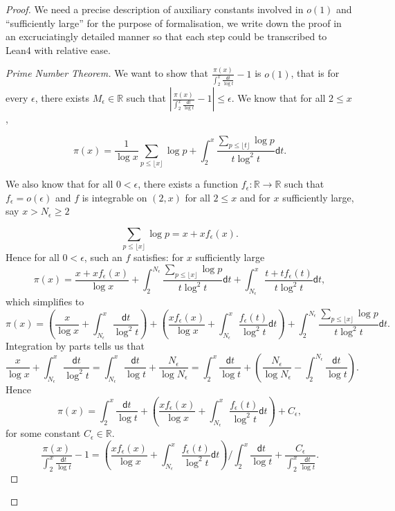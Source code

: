 \begin{proof}
    \leanok
    We need a precise description of auxiliary constants involved in $o(1)$ and ``sufficiently large'' for the purpose of formalisation, we write down the proof in an excruciatingly detailed manner so that each step could be transcribed to Lean4 with relative ease.
    \begin{proof}[Prime Number Theorem]
    We want to show that $\frac{\pi\left(x\right)}{{ \int_{2}^{x}\frac{\mathsf{d}t}{\log t}}}-1$
    is $o\left(1\right)$, that is for every $\epsilon$, there exists
    $M_{\epsilon}\in\mathbb{R}$ such that $\left|\frac{\pi\left(x\right)}{{ \int_{2}^{x}\frac{\mathsf{d}t}{\log t}}}-1\right|\le\epsilon$.
    We know that for all $2\le x$, 
    
    \[
    \pi\left(x\right)={\frac{1}{\log x}\sum_{p\le\lfloor x\rfloor}\log p+{\int_{2}^{x}\frac{\sum_{p\le\lfloor t\rfloor}\log p}{t\log^{2}t}}\mathsf{d}t}.
    \]
    
    We also know that for all $0<\epsilon$, there exists a function $f_{\epsilon}:\mathbb{R}\to\mathbb{R}$
    such that $f_{\epsilon}=o\left(\epsilon\right)$ and $f$ is integrable
    on $\left(2,x\right)$ for all $2\le x$ and for $x$ sufficiently
    large, say $x>N_{\epsilon}\ge2$
    
    \[
    \sum_{p\le\lfloor x\rfloor}\log p=x+xf_{\epsilon}\left(x\right).
    \]
    Hence for all $0<\epsilon$, such an $f$ satisfies: for $x$ sufficiently
    large
    \[
    \pi\left(x\right)=\frac{x+xf_{\epsilon}\left(x\right)}{\log x}+\int_{2}^{N_{\epsilon}}\frac{\sum_{p\le\lfloor x\rfloor}\log p}{t\log^{2}t}\mathsf{d}t+\int_{N_{\epsilon}}^{x}\frac{t+tf_{\epsilon}\left(t\right)}{t\log^{2}t}\mathsf{d}t,
    \]
    which simplifies to
    \[
    \pi\left(x\right)=\left(\frac{x}{\log x}+\int_{N_{\epsilon}}^{x}\frac{\mathsf{d}t}{\log^{2}t}\right)+\left(\frac{xf_{\epsilon}\left(x\right)}{\log x}+\int_{N_{\epsilon}}^{x}\frac{f_{\epsilon}\left(t\right)}{\log^{2}t}\mathsf{d}t\right)+\int_{2}^{N_{\epsilon}}\frac{\sum_{p\le\lfloor x\rfloor}\log p}{t\log^{2}t}\mathsf{d}t.
    \]
    Integration by parts tells us that
    \[
    \frac{x}{\log x}+\int_{N_{\epsilon}}^{x}\frac{\mathsf{d}t}{\log^{2}t}=\int_{N_{\epsilon}}^{x}\frac{\mathsf{d}t}{\log t}+\frac{N_{\epsilon}}{\log N_{\epsilon}}=\int_{2}^{x}\frac{\mathsf{d}t}{\log t}+\left(\frac{N_{\epsilon}}{\log N_{\epsilon}}-\int_{2}^{N_{\epsilon}}\frac{\mathsf{d}t}{\log t}\right).
    \]
    Hence
    \[
    \pi\left(x\right)=\int_{2}^{x}\frac{\mathsf{d}t}{\log t}+\left(\frac{xf_{\epsilon}\left(x\right)}{\log x}+\int_{N_{\epsilon}}^{x}\frac{f_{\epsilon}\left(t\right)}{\log^{2}t}\mathsf{d}t\right)+C_{\epsilon},
    \]
    for some constant $C_{\epsilon}\in\mathbb{R}$.
    \[
    \frac{\pi\left(x\right)}{\int_{2}^{x}\frac{\mathsf{d}t}{\log t}}-1=\left(\frac{xf_{\epsilon}\left(x\right)}{\log x}+\int_{N_{\epsilon}}^{x}\frac{f_{\epsilon}\left(t\right)}{\log^{2}t}\mathsf{d}t\right)/\int_{2}^{x}\frac{\mathsf{d}t}{\log t}+\frac{C_{\epsilon}}{\int_{2}^{x}\frac{\mathsf{d}t}{\log t}}.
    \]
    

\end{proof}
\end{proof}
